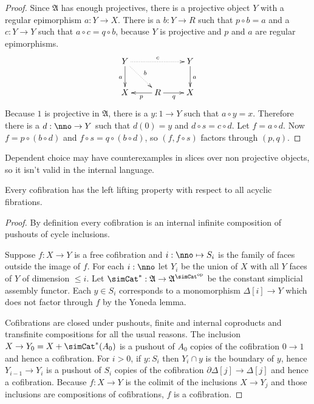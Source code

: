 \documentclass{tac}
\newcommand\hide[1]{}
\newcommand\ri{^*}
\newcommand\dual{^{\mathrm{op}}}
\newcommand\s{^{\simCat\dual}}
\newcommand\of{:}
\newcommand\simplex\Delta
\newcommand\cycle{\partial\Delta}
\newcommand\ambient{\mathfrak A}
\begin{document}
\begin{proof} Since $\ambient$ has enough projectives, there is a projective object $Y$ with a regular epimorphism $a\of Y\to X$. There is a $b\of Y\to R$ such that $p\circ b=a$ and a $c\of Y\to Y$ such that $a\circ c = q\circ b$, because $Y$ is projective and $p$ and $a$ are regular epimorphisms.
\[\xymatrix{
Y\ar@{.>}[rr]^c \ar@{.>}[dr]^b \ar[d]_a && Y\ar[d]^a\\
X & R\ar[l]^p\ar[r]_q & X
}\]
Because $1$ is projective in $\ambient$, there is a $y\of 1\to Y$ such that $a\circ y = x$. Therefore there is a $d\of\nno\to Y$ such that $d(0)=y$ and $d\circ s = c\circ d$. Let $f=a\circ d$. Now $f = p\circ (b\circ d)$ and $f\circ s = q\circ (b\circ d)$, so $(f,f\circ s)$ factors through $(p,q)$.
\end{proof}

\begin{remark} Dependent choice may have counterexamples in slices over non projective objects, so it isn't valid in the internal language. \end{remark}

\begin{lemma} Every cofibration has the left lifting property with respect to all acyclic fibrations. \label{Reedy}\end{lemma}

\begin{proof} By definition every cofibration is an internal infinite composition of pushouts of cycle inclusions. 

Suppose $f\of X\to Y$ is a free cofibration and $i\of\nno\mapsto S_i$ is the family of faces outside the image of $f$. 
For each $i\of\nno$ let $Y_i$ be the union of $X$ with all $Y$ faces of $Y$ of dimension $\leq i$.
Let $\simCat\ri\of \ambient\to\ambient\s$ be the constant simplicial assembly functor. 
Each $y\in S_i$ corresponds to a monomorphism $\simplex[i]\to Y$ which does not factor through $f$ by the Yoneda lemma.

Cofibrations are closed under pushouts, finite and internal coproducts and transfinite compositions for all the usual reasons.
The inclusion $X\to Y_0 = X+\simCat\ri(A_0)$ is a pushout of $A_0$ copies of the cofibration $0\to 1$ and hence a cofibration.
For $i>0$, if $y\of S_i$ then $Y_i\cap y$ is the boundary of $y$, hence $Y_{i-1}\to Y_i$ is a pushout of $S_i$ copies of the cofibration $\cycle[j]\to\simplex[j]$ and hence a cofibration. Because $f\of X\to Y$ is the colimit of the inclusions $X\to Y_j$ and those inclusions are compositions of cofibrations, $f$ is a cofibration.

\hide{
The exact use of the dependent choice principle is vague.
}
\end{proof}
\end{document}
